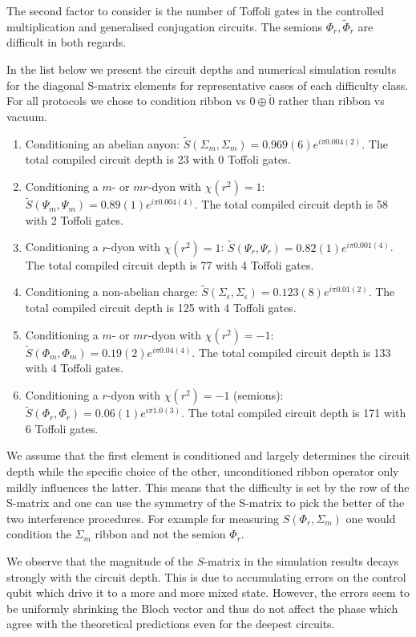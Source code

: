 \documentclass[two column]{article}
\begin{document}
The second factor to consider is the number of Toffoli gates in the controlled multiplication and generalised conjugation circuits. The semions $\Phi_r,\tilde \Phi_r$ are difficult in both regards.


In the list below we present the circuit depths and numerical simulation results for the diagonal S-matrix elements for representative cases of each difficulty class. For all protocols we chose to condition ribbon vs $0\oplus \tilde 0$ rather than ribbon vs vacuum.

\begin{enumerate}
	\item Conditioning an abelian anyon: $\tilde{S}(\Sigma_m, \Sigma_m) = 0.969(6)e^{i\pi 0.004(2)}$. The total compiled circuit depth is 23 with 0 Toffoli gates.
	\item Conditioning a $m$- or $mr$-dyon with $\chi(r^2) = 1$: $\tilde{S}(\Psi_m, \Psi_m) = 0.89(1)e^{i\pi 0.004(4)}$. The total compiled circuit depth is 58 with 2 Toffoli gates.
	\item Conditioning a $r$-dyon with $\chi(r^2) = 1$: $\tilde{S}(\Psi_r, \Psi_r) = 0.82(1)e^{i\pi 0.001(4)}$. The total compiled circuit depth is 77 with 4 Toffoli gates.
	\item Conditioning a non-abelian charge: $\tilde{S}(\Sigma_\epsilon, \Sigma_\epsilon) = 0.123(8)e^{i\pi 0.01(2)}$. The total compiled circuit depth is 125 with 4 Toffoli gates.
	\item Conditioning a $m$- or $mr$-dyon with $\chi(r^2) = -1$: $\tilde{S}(\Phi_m, \Phi_m) = 0.19(2)e^{i\pi 0.04(4)}$. The total compiled circuit depth is 133 with 4 Toffoli gates.
	\item Conditioning a $r$-dyon with $\chi(r^2) = -1$ (semions): $\tilde{S}(\Phi_r, \Phi_r) = 0.06(1)e^{i\pi 1.0(3)}$. The total compiled circuit depth is 171 with 6 Toffoli gates.
\end{enumerate}
We assume that the first element is conditioned and largely determines the circuit depth while the specific choice of the other, unconditioned ribbon operator only mildly influences the latter. This means that the difficulty is set by the row of the S-matrix and one can use the symmetry of the S-matrix to pick the better of the two interference procedures. For example for measuring $S(\Phi_r, \Sigma_m)$ one would condition the $\Sigma_m$ ribbon and not the semion $\Phi_r$.

We observe that the magnitude of the $S$-matrix in the simulation results decays strongly with the circuit depth. This is due to accumulating errors on the control qubit which drive it to a more and more mixed state. However, the errors seem to be uniformly shrinking the Bloch vector and thus do not affect the phase which agree with the theoretical predictions even for the deepest circuits.
\end{document}
